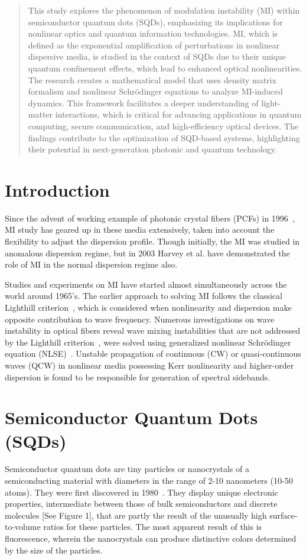 \documentclass[12pt,a4paper]{article}
\begin{document}
\begin{abstract}
    This study explores the phenomenon of modulation instability (MI) within semiconductor quantum dots (SQDs), emphasizing its implications for nonlinear optics and quantum information technologies. MI, which is defined as the exponential amplification of perturbations in nonlinear dispersive media, is studied in the context of SQDs due to their unique quantum confinement effects, which lead to enhanced optical nonlinearities. The research creates a mathematical model that uses density matrix formalism and nonlinear Schrödinger equations to analyze MI-induced dynamics. This framework facilitates a deeper understanding of light-matter interactions, which is critical for advancing applications in quantum computing, secure communication, and high-efficiency optical devices. The findings contribute to the optimization of SQD-based systems, highlighting their potential in next-generation photonic and quantum technology.
\end{abstract}

\section{Introduction}
Since the advent of working example of photonic crystal fibers (PCFs) in 1996~\cite{photoniccrystal}, MI study has geared up in these media extensively, taken into account the flexibility to adjust the dispersion profile. Though initially, the MI was studied in anomalous dispersion regime, but in 2003 Harvey et al.\cite{harvey2003scalar} have demonstrated the role of MI in the normal dispersion regime also.\par
Studies and experiments on MI have started almost simultaneously across the world around 1965's. The earlier approach to solving MI follows the classical Lighthill criterion~\cite{lighthall}, which is considered when nonlinearity and dispersion make opposite contribution to wave frequency. Numerous investigations on wave instability in optical fibers reveal wave mixing instabilities that are not addressed by the Lighthill criterion~\cite{lighthall}, were solved using generalized nonlinear Schr\"{o}dinger equation (NLSE)~\cite{RBoyd}. Unstable propagation of continuous (CW) or quasi-continuous waves (QCW) in nonlinear media possessing Kerr nonlinearity and higher-order dispersion is found to be responsible for generation of spectral sidebands.

\section{Semiconductor Quantum Dots (SQDs)}
Semiconductor quantum dots are tiny particles or nanocrystals of a semiconducting material with diameters in the range of 2-10 nanometers (10-50 atoms). They were first discovered in 1980~\cite{quantumdots1980}. They display unique electronic properties, intermediate between those of bulk semiconductors and discrete molecules [See Figure 1], that are partly the result of the unusually high surface-to-volume ratios for these particles. The most apparent result of this is fluorescence, wherein the nanocrystals can produce distinctive colors determined by the size of the particles.
\end{document}
